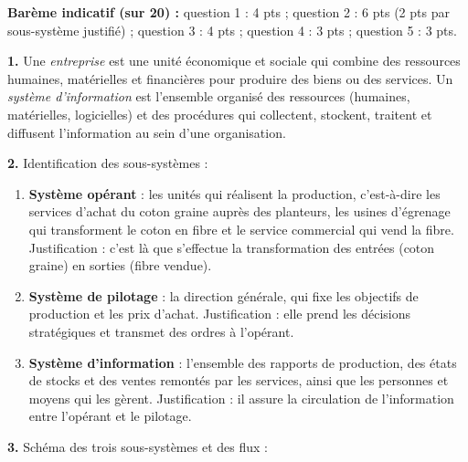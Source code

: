 \documentclass[11pt]{article}
\begin{document}
\begin{corrige}
\textbf{Barème indicatif (sur 20) :} question 1 : 4 pts ; question 2 : 6 pts (2 pts par sous-système justifié) ; question 3 : 4 pts ; question 4 : 3 pts ; question 5 : 3 pts.

\textbf{1.} Une \emph{entreprise} est une unité économique et sociale qui combine des ressources humaines, matérielles et financières pour produire des biens ou des services. Un \emph{système d'information} est l'ensemble organisé des ressources (humaines, matérielles, logicielles) et des procédures qui collectent, stockent, traitent et diffusent l'information au sein d'une organisation.

\textbf{2.} Identification des sous-systèmes :
\begin{enumerate}
\item \textbf{Système opérant} : les unités qui réalisent la production, c'est-à-dire les services d'achat du coton graine auprès des planteurs, les usines d'égrenage qui transforment le coton en fibre et le service commercial qui vend la fibre. Justification : c'est là que s'effectue la transformation des entrées (coton graine) en sorties (fibre vendue).
\item \textbf{Système de pilotage} : la direction générale, qui fixe les objectifs de production et les prix d'achat. Justification : elle prend les décisions stratégiques et transmet des ordres à l'opérant.
\item \textbf{Système d'information} : l'ensemble des rapports de production, des états de stocks et des ventes remontés par les services, ainsi que les personnes et moyens qui les gèrent. Justification : il assure la circulation de l'information entre l'opérant et le pilotage.
\end{enumerate}

\textbf{3.} Schéma des trois sous-systèmes et des flux :


\end{corrige}
\end{document}
